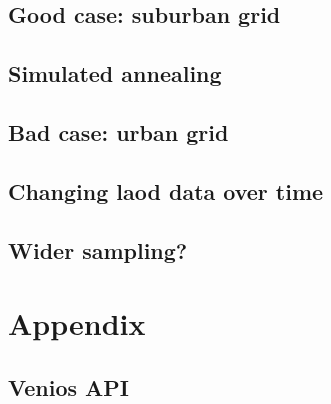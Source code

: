 \documentclass[a4paper]{report}
\begin{document}


\section{Good case: suburban grid}



\section{Simulated annealing}




\section{Bad case: urban grid}

\section{Changing laod data over time}

\section{Wider sampling?}

\chapter{Appendix}

\section{Venios API}\label{sec:appendix:api}



\printbibliography
\end{document}
